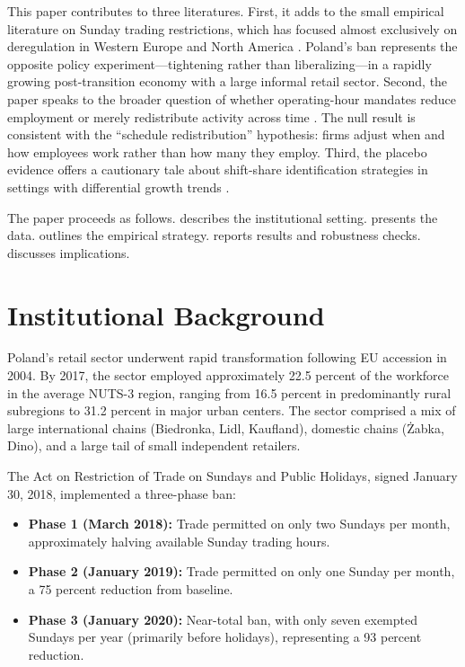 \documentclass[12pt]{article}
\begin{document}
This paper contributes to three literatures. First, it adds to the small empirical literature on Sunday trading restrictions, which has focused almost exclusively on deregulation in Western Europe and North America \citep{GoosManning2005, Skuterud2005, Redmond2012}. Poland's ban represents the opposite policy experiment---tightening rather than liberalizing---in a rapidly growing post-transition economy with a large informal retail sector. Second, the paper speaks to the broader question of whether operating-hour mandates reduce employment or merely redistribute activity across time \citep{Hamermesh1999, CostaDesy2008}. The null result is consistent with the ``schedule redistribution'' hypothesis: firms adjust when and how employees work rather than how many they employ. Third, the placebo evidence offers a cautionary tale about shift-share identification strategies in settings with differential growth trends \citep{GoldsmithPinkhamSorkinSwift2020, BorusyakHullJaravelEconometrica2022}.

The paper proceeds as follows.  describes the institutional setting.  presents the data.  outlines the empirical strategy.  reports results and robustness checks.  discusses implications.


\section{Institutional Background}
\label{sec:background}

Poland's retail sector underwent rapid transformation following EU accession in 2004. By 2017, the sector employed approximately 22.5 percent of the workforce in the average NUTS-3 region, ranging from 16.5 percent in predominantly rural subregions to 31.2 percent in major urban centers. The sector comprised a mix of large international chains (Biedronka, Lidl, Kaufland), domestic chains (\.{Z}abka, Dino), and a large tail of small independent retailers.

The Act on Restriction of Trade on Sundays and Public Holidays, signed January 30, 2018, implemented a three-phase ban:

\begin{itemize}
\item \textbf{Phase 1 (March 2018):} Trade permitted on only two Sundays per month, approximately halving available Sunday trading hours.
\item \textbf{Phase 2 (January 2019):} Trade permitted on only one Sunday per month, a 75 percent reduction from baseline.
\item \textbf{Phase 3 (January 2020):} Near-total ban, with only seven exempted Sundays per year (primarily before holidays), representing a 93 percent reduction.
\end{itemize}
\end{document}
